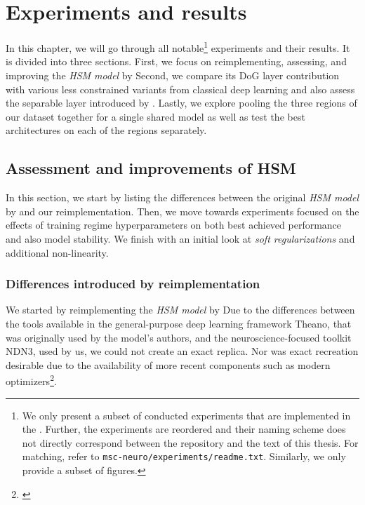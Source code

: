 \renewcommand*\thesubsubsection{\arabic{section}.\arabic{subsection}.\arabic{subsubsection}}
\setlength{\abovecaptionskip}{0pt plus 0pt minus 0pt} %

\chapter{Experiments and results}\label{ch:5}

In this chapter, we will go through all notable\footnote{We only present a subset of conducted experiments that are implemented in the . Further, the experiments are reordered and their naming scheme does not directly correspond between the repository and the text of this thesis. For matching, refer to \texttt{msc-neuro/experiments/readme.txt}. Similarly, we only provide a subset of figures.} experiments and their results. It is divided into three sections. First, we focus on reimplementing, assessing, and improving the \textit{HSM model} by \cite{antolik} Second, we compare its DoG layer contribution with various less constrained variants from classical deep learning and also assess the separable layer introduced by \cite{klindt}. Lastly, we explore pooling the three regions of our dataset together for a single shared model as well as test the best architectures on each of the regions separately.


\section{Assessment and improvements of HSM}

In this section, we start by listing the differences between the original \textit{HSM model} by \citeauthor{antolik} and our reimplementation. Then, we move towards experiments focused on the effects of training regime hyperparameters on both best achieved performance and also model stability. We finish with an initial look at \textit{soft regularizations} and additional non-linearity.

\addtocounter{subsection}{-1} %
\subsection{Differences introduced by reimplementation}\label{ch:5.1.0}

We started by reimplementing the \textit{HSM model} by \citeauthor{antolik} Due to the differences between the tools available in the general-purpose deep learning framework Theano, that was originally used by the model’s authors, and the neuroscience-focused toolkit NDN3, used by us, we could not create an exact replica. Nor was exact recreation desirable due to the availability of more recent components such as modern optimizers\footnote{\citep{2016arXiv160904747R}}.

